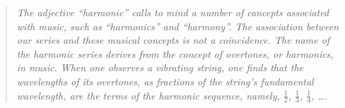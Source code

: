 \begin{quote}
{\em The adjective ``harmonic'' calls to mind a number of cancepts
  associated with {\em music}, such as ``harmonics'' and ``harmony''.
  The association between our series and these musical concepts is not
  a coincidence.  The name of the harmonic series derives from the
  concept of {\em overtones}, or {\em harmonics}, in music.  When one
  observes a vibrating string, one finds that the wavelengths of its
  overtones, as fractions of the string's fundamental wavelength, are
  the terms of the {\em harmonic sequence}, namely, $\frac{1}{2}$,
  $\frac{1}{3}$, $\frac{1}{4}$, \ldots.  }
\end{quote}








